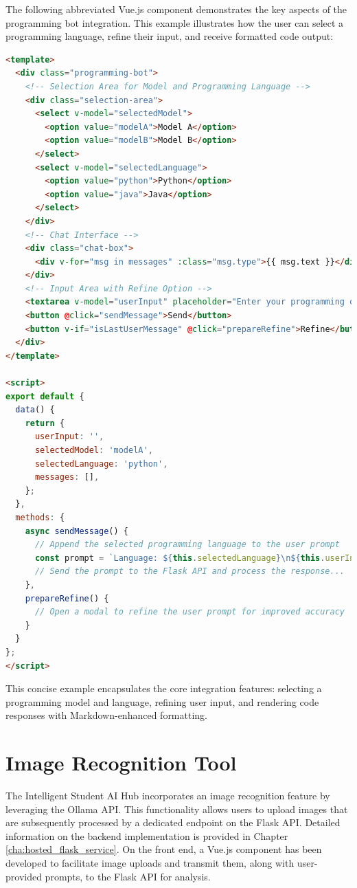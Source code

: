 The following abbreviated Vue.js component demonstrates the key aspects of the programming bot integration. This example illustrates how the user can select a programming language, refine their input, and receive formatted code output:

\begin{lstlisting}[language=html, caption={Abbreviated Vue.js Component for the Programming Bot}, frame=single]
<template>
  <div class="programming-bot">
    <!-- Selection Area for Model and Programming Language -->
    <div class="selection-area">
      <select v-model="selectedModel">
        <option value="modelA">Model A</option>
        <option value="modelB">Model B</option>
      </select>
      <select v-model="selectedLanguage">
        <option value="python">Python</option>
        <option value="java">Java</option>
      </select>
    </div>
    <!-- Chat Interface -->
    <div class="chat-box">
      <div v-for="msg in messages" :class="msg.type">{{ msg.text }}</div>
    </div>
    <!-- Input Area with Refine Option -->
    <textarea v-model="userInput" placeholder="Enter your programming question..."></textarea>
    <button @click="sendMessage">Send</button>
    <button v-if="isLastUserMessage" @click="prepareRefine">Refine</button>
  </div>
</template>

<script>
export default {
  data() {
    return {
      userInput: '',
      selectedModel: 'modelA',
      selectedLanguage: 'python',
      messages: [],
    };
  },
  methods: {
    async sendMessage() {
      // Append the selected programming language to the user prompt
      const prompt = `Language: ${this.selectedLanguage}\n${this.userInput}`;
      // Send the prompt to the Flask API and process the response...
    },
    prepareRefine() {
      // Open a modal to refine the user prompt for improved accuracy
    }
  }
};
</script>
\end{lstlisting}

This concise example encapsulates the core integration features: selecting a programming model and language, refining user input, and rendering code responses with Markdown-enhanced formatting.

\section{Image Recognition Tool}

The Intelligent Student AI Hub incorporates an image recognition feature by leveraging the Ollama API. This functionality allows users to upload images that are subsequently processed by a dedicated endpoint on the Flask API. Detailed information on the backend implementation is provided in Chapter \ref{cha:hosted_flask_service}. On the front end, a Vue.js component has been developed to facilitate image uploads and transmit them, along with user-provided prompts, to the Flask API for analysis.

